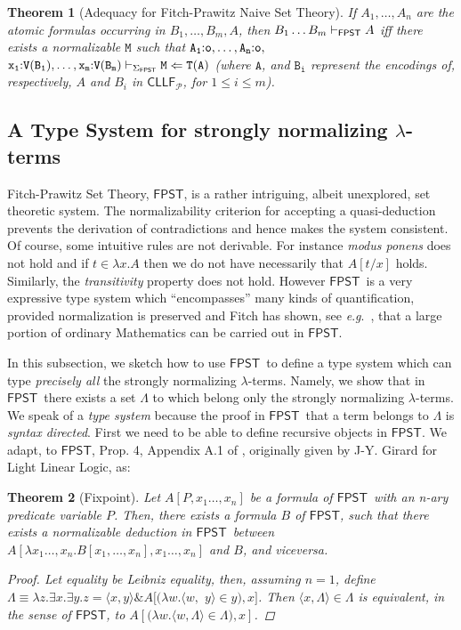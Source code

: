 \documentclass[submission,copyright,creativecommons]{eptcs}
\theoremstyle{plain}
\newtheorem{theorem}{Theorem}[section]
\theoremstyle{definition}
\newcommand{\CLLFP} {\mbox{$\mathsf{CLLF}_{\mathcal P}$}}
\newcommand{\FPST}   {\mbox{$\mathsf{FPST}$}}
\newcommand {\eg}        {{\textit{e}.\textit{g}.}}
\begin{document}
\begin{theorem}[Adequacy for Fitch-Prawitz Naive Set Theory]
  If $A_1,\ldots,A_n$ are the atomic formulas occurring in
  $B_1,\ldots,B_m,A$, then $B_1\ldots B_m \vdash_{\sf FPST} A $ iff
  there exists a normalizable $\mathtt{M}$ such that
  $\mathtt{A_1{:} o,\ldots,A_n{:} o,}$ $\mathtt{x_1{:} V(B_1),\ldots,x_m{:}
    V(B_m)} \vdash_{\Sigma_{\sf FPST}}\mathtt{M \Leftarrow T(A)}$
  (where $\mathtt{A}$, and $\mathtt{B_i}$ represent the encodings of,
  respectively, $A$ and $B_i$ in \CLLFP, for $1\leq i\leq m$).
\end{theorem}

\subsection{A Type System for strongly normalizing $\lambda$-terms}
Fitch-Prawitz Set Theory, \FPST, is a rather intriguing, albeit
unexplored, set theoretic system. The normalizability criterion for
accepting a quasi-deduction prevents the derivation of contradictions
and hence makes the system consistent. Of course, some intuitive rules
are not derivable. For instance \emph{modus ponens} does not hold and
if $t \in \lambda x. A$ then we do not have necessarily that $A[t/x]$
holds.  Similarly, the \emph{transitivity} property does not
hold. However \FPST\ is a very expressive type system which
``encompasses'' many kinds of quantification, provided normalization
is preserved and Fitch has shown, see \eg\ \cite{fitch}, that a large
portion of ordinary Mathematics can be carried out in \FPST.

In this subsection, we sketch how to use \FPST\ to define a {type
  system} which can type \emph{precisely all} the strongly normalizing
$\lambda$-terms. Namely, we show that in \FPST\ there exists a set
$\Lambda$ to which belong only the strongly normalizing
$\lambda$-terms. We speak of a \emph{type system} because the proof in
\FPST\ that a term belongs to $\Lambda$ is \emph{syntax
  directed}. First we need to be able to define recursive objects in
\FPST. We adapt, to \FPST, Prop. 4, Appendix A.1 of
\cite{girard1998light}, originally given by J-Y. Girard for Light
Linear Logic, as: 
\begin{theorem}[Fixpoint]
  Let $A[P,x_1 \ldots,x_n]$ be a formula of \FPST\ with an n-ary
  predicate variable $P$. Then, there exists a formula $B$ of \FPST, such
  that there exists a normalizable deduction in \FPST\ between
  $ A[\lambda x_1\ldots,x_{{n}}. B[x_1,\ldots, x_n],x_1
  \ldots,x_n]$ and $B$, and viceversa.\vspace{-1ex}
\begin{proof}
  Let equality be  Leibniz equality, then, assuming $n=1$,
  define
  $\Lambda \equiv \lambda z. \exists x{.\exists y.}
  z={\langle} x,y{\rangle} \& A[(\lambda
  w. {\langle} w,$ $y{\rangle}\in y),x]$.
  Then ${\langle} x,\Lambda{\rangle} \in \Lambda$ is
  equivalent, in the sense of \FPST, to
  $A[{(}\lambda w. {\langle}
  w,\Lambda{\rangle}\in \Lambda),x]$.
\end{proof}
\end{theorem}
\end{document}
